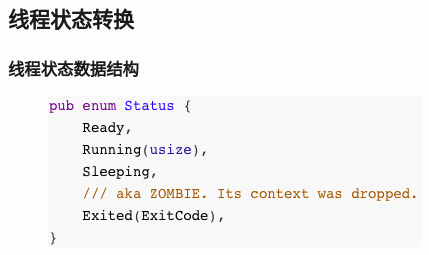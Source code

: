 % 
% 
% 
% 
% 
\subsection{线程状态转换} %
\begin{frame}[fragile]
    \frametitle{线程状态数据结构}
    \begin{figure}
    \includegraphics[width=0.5\linewidth]{figs/enum-Status.png}
    \end{figure}

\end{frame}
% 
% 
% 

